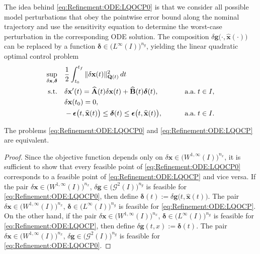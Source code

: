 \documentclass[onefignum,onetabnum]{siamart220329}
\numberwithin{equation}{section}
\newcommand{\aall}{\mbox{ a.a.} \;}
\newcommand{\bg}{\ensuremath{\mathbf{g}}} %
\newcommand{\bx}{\ensuremath{\mathbf{x}}} %
\newcommand {\bdelta} {\boldsymbol{\delta}}
\newcommand {\bepsilon} {\mbox{\boldmath $\epsilon$}}
\newcommand{\BA}{\ensuremath{\mathbf{A}} } %
\newcommand{\BB}{\ensuremath{\mathbf{B}} } %
\newcommand{\BQ}{\ensuremath{\mathbf{Q}} } %
\newcommand {\cG} {\mathcal{G}}
\newcommand{\WW}{\big( W^{1, \infty}(I) \big)^{n_x}}
\begin{document}
The idea behind \eqref{eq:Refinement:ODE:LQOCP0} is that we consider all possible model perturbations that obey the pointwise error bound along the nominal trajectory and use the sensitivity equation to determine the worst-case perturbation in the corresponding ODE solution.
The composition $\delta \bg \big(\cdot, \widehat{\bx}(\cdot) \big)$ can be replaced
by a function $\bdelta \in \big( L^\infty(I) \big)^{n_g}$, yielding the linear quadratic optimal control problem
\begin{subequations} \label{eq:Refinement:ODE:LQOCP}
\begin{align}
	\sup_{\delta \bx, \bdelta} \quad &\frac{1}{2} \int_{t_0}^{t_f} \| \delta \bx(t) \|_{\BQ(t)}^2 \, dt \\
	\mbox{s.t.} \quad & \delta \bx'(t) = \widehat{\BA}(t)  \delta \bx(t) +  \widehat{\BB}(t)   \bdelta(t), & \qquad \aall t \in I, \\
	& \delta \bx(t_0) = 0, \\
	& - \bepsilon\big( t, \widehat{\bx}(t) \big) \leq \bdelta(t) \leq \bepsilon\big( t, \widehat{\bx}(t) \big), & \qquad \aall t \in I. \label{eq:ODE_sensitivity_sol:box-constraints}
\end{align}
\end{subequations}

\begin{theorem}  \label{th:ODE:LQOCP0=LQOCP}
    The problems \eqref{eq:Refinement:ODE:LQOCP0} and  \eqref{eq:Refinement:ODE:LQOCP} are equivalent.
\end{theorem}
\begin{proof}
     Since the objective function depends only on $\delta \bx \in \WW$, it is sufficient to show that
     every feasible point of \eqref{eq:Refinement:ODE:LQOCP0} corresponds to a  feasible point of \eqref{eq:Refinement:ODE:LQOCP} and vice versa.
     If the pair $\delta \bx \in \WW$, $\delta \bg \in \big(\cG^2(I)\big)^{n_g}$ is feasible for  \eqref{eq:Refinement:ODE:LQOCP0},
     then define $\bdelta(t) := \delta \bg\big( t, \widehat{\bx}(t) \big)$. The pair 
     $\delta \bx \in \WW$, $ \bdelta \in  \big( L^\infty(I) \big)^{n_g}$ is feasible for  \eqref{eq:Refinement:ODE:LQOCP}.
     On the other hand, if the pair $\delta \bx \in \WW$, $ \bdelta \in  \big( L^\infty(I) \big)^{n_g}$ is feasible for  \eqref{eq:Refinement:ODE:LQOCP},
     then define  $\delta \bg( t, x ) :=  \bdelta(t)$. The pair  $\delta \bx \in \WW$, $\delta \bg \in \big(\cG^2(I)\big)^{n_g}$ is feasible for  
     \eqref{eq:Refinement:ODE:LQOCP0}.
\end{proof}
\end{document}
